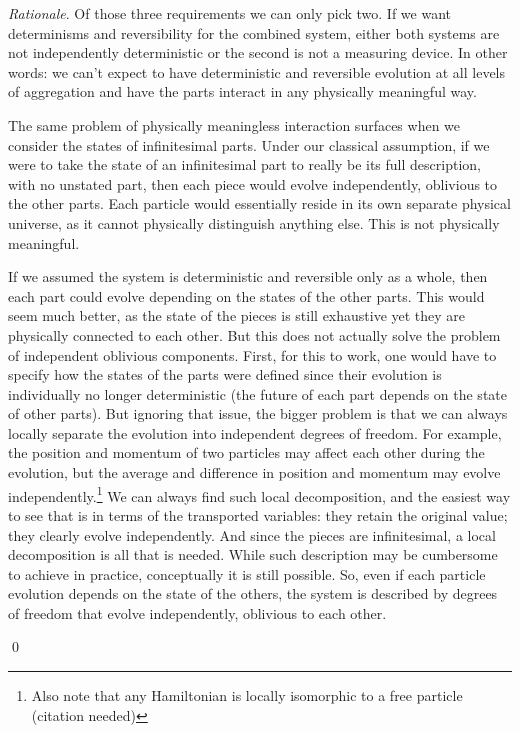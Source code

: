 \documentclass[aps,pra,10pt,twocolumn,floatfix,nofootinbib]{revtex4-1}
\numberwithin{equation}{section}
\theoremstyle{definition}
\newenvironment{rationale}{\emph{Rationale}.}{\qed}
\begin{document}
\begin{rationale}
	Of those three requirements we can only pick two. If we want determinisms and reversibility for the combined system, either both systems are not independently deterministic or the second is not a measuring device. In other words: we can't expect to have deterministic and reversible evolution at all levels of aggregation and have the parts interact in any physically meaningful way.
	
	The same problem of physically meaningless interaction surfaces when we consider the states of infinitesimal parts. Under our classical assumption, if we were to take the state of an infinitesimal part to really be its full description, with no unstated part, then each piece would evolve independently, oblivious to the other parts. Each particle would essentially reside in its own separate physical universe, as it cannot physically distinguish anything else. This is not physically meaningful.
	
	If we assumed the system is deterministic and reversible only as a whole, then each part could evolve depending on the states of the other parts. This would seem much better, as the state of the pieces is still exhaustive yet they are physically connected to each other. But this does not actually solve the problem of independent oblivious components. First, for this to work, one would have to specify how the states of the parts were defined since their evolution is individually no longer deterministic (the future of each part depends on the state of other parts). But ignoring that issue, the bigger problem is that we can always locally separate the evolution into independent degrees of freedom. For example, the position and momentum of two particles may affect each other during the evolution, but the average and difference in position and momentum may evolve independently.\footnote{Also note that any Hamiltonian is locally isomorphic to a free particle (citation needed)} We can always find such local decomposition, and the easiest way to see that is in terms of the transported variables: they retain the original value; they clearly evolve independently. And since the pieces are infinitesimal, a local decomposition is all that is needed. While such description may be cumbersome to achieve in practice, conceptually it is still possible. So, even if each particle evolution depends on the state of the others, the system is described by degrees of freedom that evolve independently, oblivious to each other.	
	

\end{rationale}
\end{document}
